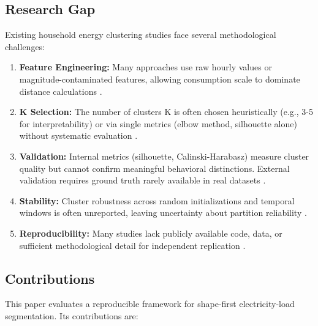 \documentclass[11pt,a4paper]{article}
\begin{document}
\subsection{Research Gap}

Existing household energy clustering studies face several methodological challenges:

\begin{enumerate}
    \item \textbf{Feature Engineering:} Many approaches use raw hourly values or magnitude-contaminated features, allowing consumption scale to dominate distance calculations \cite{kwac2014household,rhodes2014clustering}.
    
    \item \textbf{K Selection:} The number of clusters K is often chosen heuristically (e.g., 3-5 for interpretability) or via single metrics (elbow method, silhouette alone) without systematic evaluation \cite{hennig2020comparing}.
    
    \item \textbf{Validation:} Internal metrics (silhouette, Calinski-Harabasz) measure cluster quality but cannot confirm meaningful behavioral distinctions. External validation requires ground truth rarely available in real datasets \cite{gates2019adjusted}.
    
    \item \textbf{Stability:} Cluster robustness across random initializations and temporal windows is often unreported, leaving uncertainty about partition reliability \cite{henning2020adjusting}.
    
    \item \textbf{Reproducibility:} Many studies lack publicly available code, data, or sufficient methodological detail for independent replication \cite{peng2011reproducible}.
\end{enumerate}

\subsection{Contributions}

This paper evaluates a reproducible framework for shape-first electricity-load segmentation. Its contributions are:
\end{document}
